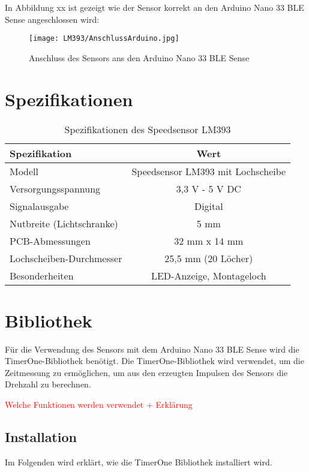 In Abbildung xx ist gezeigt wie der Sensor korrekt an den Arduino Nano 33 BLE Sense angeschlossen wird:

\begin{figure}[htpb]
	\centering
	\texttt{[image: LM393/AnschlussArduino.jpg]}
	\caption{Anschluss des Sensors ans den Arduino Nano 33 BLE Sense}
	\label{fig:AnschlussArduinoLM393}
\end{figure}


\section{Spezifikationen}

\begin{table}[htpb]
	\centering
	\begin{tabular}{|l|c|}
		\hline
		\textbf{Spezifikation} & \textbf{Wert} \\
		\hline
		Modell & Speedsensor LM393 mit Lochscheibe \\
		Versorgungsspannung & 3,3 V - 5 V DC \\
		Signalausgabe & Digital \\
		Nutbreite (Lichtschranke) & 5 mm \\
		PCB-Abmessungen & 32 mm x 14 mm \\
		Lochscheiben-Durchmesser & 25,5 mm (20 Löcher) \\
		Besonderheiten & LED-Anzeige, Montageloch \\
		\hline
	\end{tabular}
	\caption{Spezifikationen des Speedsensor LM393}
	\label{tab:SpezifikationLM393}
\end{table}

\section{Bibliothek}

Für die Verwendung des Sensors mit dem Arduino Nano 33 BLE Sense wird die TimerOne-Bibliothek benötigt. Die TimerOne-Bibliothek wird verwendet, um die Zeitmessung zu ermöglichen, um aus den erzeugten Impulsen des Sensors die Drehzahl zu berechnen.

\textcolor{red}{Welche Funktionen werden verwendet + Erklärung}

\subsection{Installation}

Im Folgenden wird erklärt, wie die TimerOne Bibliothek installiert wird.

